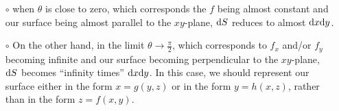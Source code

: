 \begin{itemize}\itemsep1pt \parskip0pt  %
\item[$\circ$]
when $\theta$ is close to zero, which corresponds the $f$ being almost constant
and our surface being almost parallel to the $xy$-plane, $\mathrm{d}S$ 
reduces to almost $\mathrm{d}x\mathrm{d}y$.

\item[$\circ$]
On the other hand, in the limit $\theta\rightarrow\frac{\pi}{2}$, which 
corresponds to $f_x$ and/or $f_y$ becoming infinite
and our surface becoming perpendicular to the $xy$-plane, 
$\mathrm{d}S$ becomes ``infinity times'' $\mathrm{d}x\mathrm{d}y$. In this case,
we should represent our surface either in the form $x=g(y,z)$ 
or in the form $y=h(x,z)$, rather than in the form $z=f(x,y)$.

\end{itemize}


